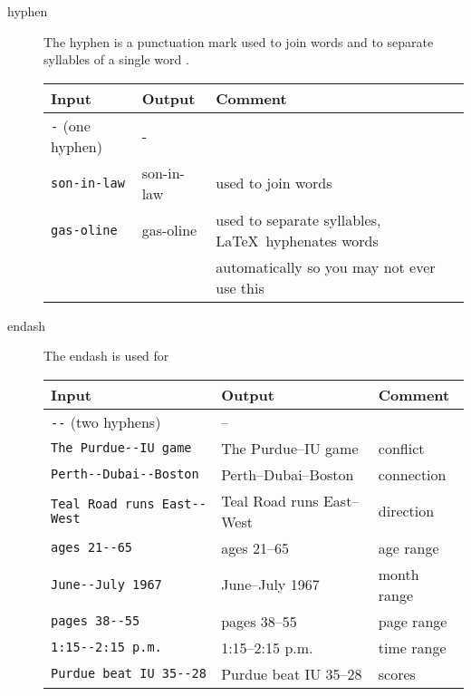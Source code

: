 \begin{description}

  \item[hyphen]
    The hyphen
    is a punctuation mark used to join words
    and to separate syllables of a single word
    \cite{wikipedia-hyphen}.
    \begin{singlespace}
      \begin{tabular}{@{}lll@{}}
        \toprule
        \bfseries Input& \bfseries Output& \bfseries Comment\\
        \midrule
        \verb+-+ (one hyphen)& -\\
        \verb+son-in-law+& son-in-law& used to join words\\
        \verb+gas-oline+& gas-oline& used to separate syllables, \LaTeX\ hyphenates words\\
        & & automatically so you may not ever use this\\
        \bottomrule
      \end{tabular}
    \end{singlespace}

  \item[endash]
    The endash
    \cite{wikipedia-endash}
     is used for
    \begin{singlespace}
      \begin{tabular}{@{}lll@{}}
        \toprule
        \bfseries Input& \bfseries Output& \bfseries Comment\\
        \midrule
        \verb+--+ (two hyphens)& --\\
        \verb+The Purdue--IU game+& The Purdue--IU game& conflict\\
        \verb+Perth--Dubai--Boston+& Perth--Dubai--Boston& connection\\
        \verb+Teal Road runs East--West+& Teal Road runs East--West& direction\\
        \verb+ages 21--65+& ages 21--65& age range\\
        \verb+June--July 1967+& June--July 1967& month range\\
        \verb+pages 38--55+& pages 38--55& page range\\
        \verb+1:15--2:15 p.m.+& 1:15--2:15 p.m.& time range\\
        \verb+Purdue beat IU 35--28+& Purdue beat IU 35--28& scores\\
        \bottomrule
      \end{tabular}
    \end{singlespace}


\end{description}
